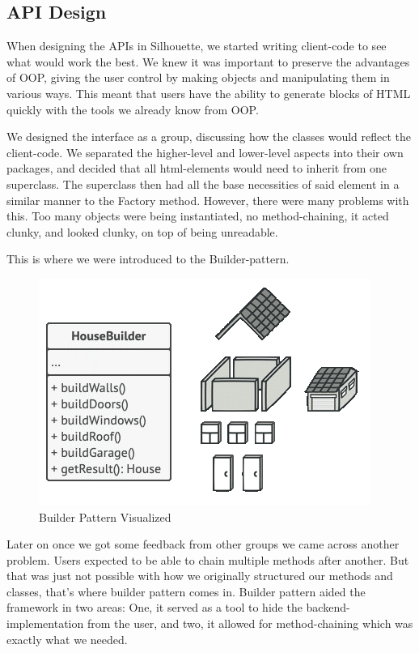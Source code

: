 \documentclass[12pt]{article}
\begin{document}
    \subsection{API Design}

    When designing the APIs in Silhouette, we started writing client-code to see what would work the best. We knew it was important to preserve the advantages of OOP, giving the user control by making objects and manipulating them in various ways. This meant that users have the ability to generate blocks of HTML quickly with the tools we already know from OOP.

    We designed the interface as a group, discussing how the classes would reflect the client-code. We separated the higher-level and lower-level aspects into their own packages, and decided that all html-elements would need to inherit from one superclass. The superclass then had all the base necessities of said element in a similar manner to the Factory method. However, there were many problems with this. Too many objects were being instantiated, no method-chaining, it acted clunky, and looked clunky, on top of being unreadable.

    This is where we were introduced to the Builder-pattern.

    \begin{figure}[H]
        \centering
        \includegraphics[scale=0.5]{images/builderPattern.png}
        \caption{Builder Pattern Visualized}
    \end{figure}
    
    Later on once we got some feedback from other groups we came across another problem. Users expected to be able to chain multiple methods after another. But that was just not possible with how we originally structured our methods and classes, that's where builder pattern comes in. Builder pattern aided the framework in two areas: One, it served as a tool to hide the backend-implementation from the user, and two, it allowed for method-chaining which was exactly what we needed.
\end{document}

